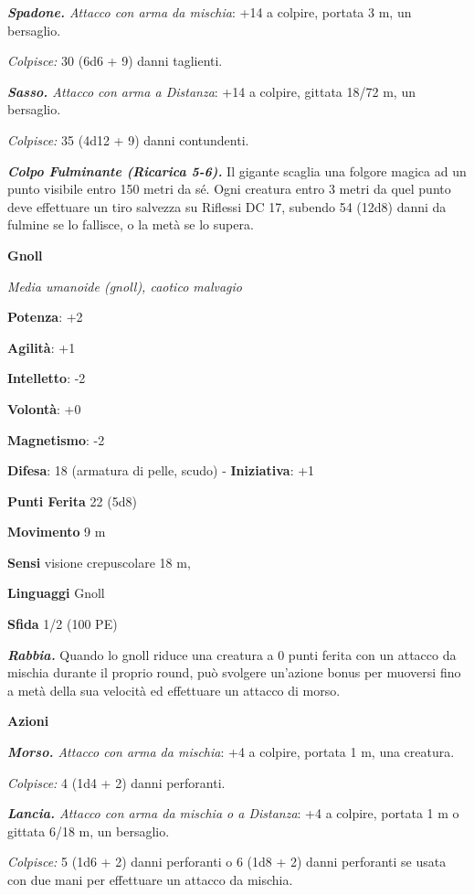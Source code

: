 \begin{multicols}{2}
\emph{\textbf{Spadone.} Attacco con arma da mischia}: +14 a colpire,
portata 3 m, un bersaglio.

\emph{Colpisce:} 30 (6d6 + 9) danni taglienti.

\emph{\textbf{Sasso.} Attacco con arma a Distanza}: +14 a colpire,
gittata 18/72 m, un bersaglio.

\emph{Colpisce:} 35 (4d12 + 9) danni contundenti.

\emph{\textbf{Colpo Fulminante (Ricarica 5-6).}} Il gigante scaglia una
folgore magica ad un punto visibile entro 150 metri da sé. Ogni creatura
entro 3 metri da quel punto deve effettuare un tiro salvezza su Riflessi DC 17, subendo 54 (12d8) danni da fulmine se lo fallisce, o la
metà se lo supera.



\textbf{Gnoll}

\emph{Media umanoide (gnoll), caotico malvagio}

\textbf{Potenza}: +2

\textbf{Agilità}: +1

\textbf{Intelletto}: -2

\textbf{Volontà}: +0

\textbf{Magnetismo}: -2

\textbf{Difesa}: 18 (armatura di pelle, scudo) - \textbf{Iniziativa}: +1

\textbf{Punti Ferita} 22 (5d8)

\textbf{Movimento} 9 m

\textbf{Sensi} visione crepuscolare 18 m, 

\textbf{Linguaggi} Gnoll

\textbf{Sfida} 1/2 (100 PE)\smallskip

\emph{\textbf{Rabbia.}} Quando lo gnoll riduce una creatura a 0 punti
ferita con un attacco da mischia durante il proprio round, può svolgere
un'azione bonus per muoversi fino a metà della sua velocità ed
effettuare un attacco di morso.

\smallskip\textbf{Azioni}

\emph{\textbf{Morso.} Attacco con arma da mischia}: +4 a colpire,
portata 1 m, una creatura.

\emph{Colpisce:} 4 (1d4 + 2) danni perforanti.

\emph{\textbf{Lancia.} Attacco con arma da mischia o a Distanza}: +4 a
colpire, portata 1 m o gittata 6/18 m, un bersaglio.

\emph{Colpisce:} 5 (1d6 + 2) danni perforanti o 6 (1d8 + 2) danni
perforanti se usata con due mani per effettuare un attacco da mischia.


\end{multicols}
